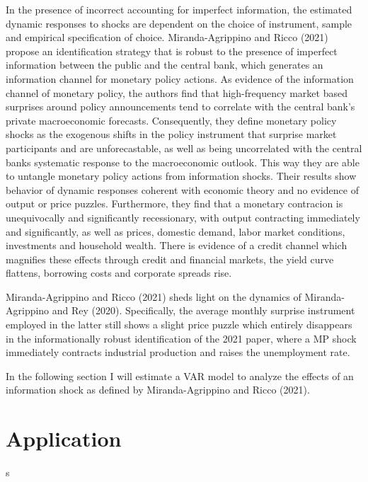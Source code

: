 \documentclass[10pt,a4paper,draft]{article}
\begin{document}
In the presence of incorrect accounting for imperfect information, the estimated dynamic responses to shocks are dependent on the choice of instrument, sample and empirical specification of choice. Miranda-Agrippino and Ricco (2021) propose an identification strategy that is robust to the presence of imperfect information between the public and the central bank, which generates an information channel for monetary policy actions. 
As evidence of the information channel of monetary policy, the authors find that high-frequency market based surprises around policy announcements tend to correlate with the central bank's private macroeconomic forecasts. Consequently, they define monetary policy shocks as the exogenous shifts in the policy instrument that surprise market participants and are unforecastable, as well as being uncorrelated with the central banks systematic response to the macroeconomic outlook.  This way they are able to untangle monetary policy actions from information shocks. 
Their results show behavior of dynamic responses coherent with economic theory and no evidence of output or price puzzles. Furthermore, they find that a monetary contracion is unequivocally and significantly recessionary, with output contracting immediately and significantly, as well as prices, domestic demand, labor market conditions, investments and household wealth. There is evidence of a credit channel which magnifies these effects through credit and financial markets, the yield curve flattens, borrowing costs and corporate spreads rise.





Miranda-Agrippino and Ricco (2021) sheds light on the dynamics of Miranda-Agrippino and Rey (2020). Specifically, the average monthly surprise instrument employed in the latter still shows a slight price puzzle which entirely disappears in the informationally robust identification of the 2021 paper, where a MP shock immediately contracts industrial production and raises the unemployment rate.



In the following section I will estimate a VAR model to analyze the effects of an information shock as defined by Miranda-Agrippino and Ricco (2021).

\section{Application}
s
\end{document}
